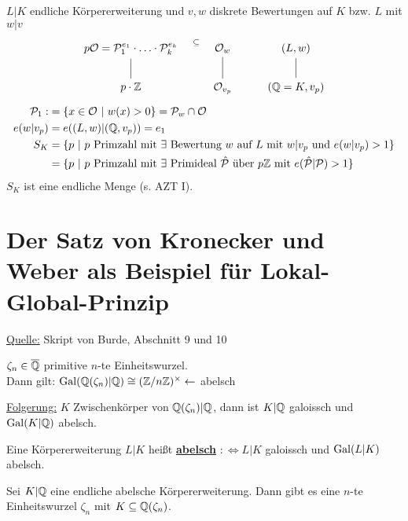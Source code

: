 
\begin{Bem}
$L|K$ endliche Körpererweiterung und $v,w$ diskrete Bewertungen auf $K$ bzw. $L$ mit $w|v$
\[
\begin{tikzcd}
p \O = \mathcal{P}_1^{e_1} \cdot \ldots \cdot \mathcal{P}_k^{e_k} \arrow[draw=none, auto=false, sloped, r, "\subseteq"] & \O_w & (L,w)\\
p\cdot \Z \arrow[dash, u] & \O_{v_p} \arrow[dash, u] & (\Q=K,v_p) \arrow[dash, u]
\end{tikzcd}
\]
\begin{align*}
\mathcal{P}_1:&=\{x \in \mathcal{O} \ | \ w(x) >0\}=\mathcal{P}_w \cap \mathcal{O}\\
e(w|v_p)&=e((L,w)|(\mathbb{Q},v_p))=e_1\\
S_K&=\{p \ | \ p \text{ Primzahl mit } \exists \text{ Bewertung } w \text{ auf } L \text{ mit } w|v_p \text{ und } e(w|v_p)>1\}\\
&=\{p \ | \ p \text{ Primzahl mit } \exists \text{ Primideal } \hat{\mathcal{P}} \text{ über } p \mathbb{Z} \text{ mit } e(\hat{\mathcal{P}}|\mathcal{P})>1\}
\end{align*}
$S_K$ ist eine endliche Menge (s. AZT I).
\end{Bem}

\section{Der Satz von Kronecker und Weber als Beispiel für Lokal-Global-Prinzip}
\underline{Quelle:} Skript von Burde, Abschnitt 9 und 10\\
\begin{Err}
$\zeta_n \in \overline{\mathbb{Q}}$ primitive $n$-te Einheitswurzel.\\
Dann gilt: $\operatorname{Gal}(\mathbb{Q}(\zeta_n)|\mathbb{Q}) \cong (\mathbb{Z}/n\mathbb{Z})^\times \leftarrow $ abelsch
\end{Err}

\underline{Folgerung:} $K$ Zwischenkörper von $\mathbb{Q}(\zeta_n)|\mathbb{Q}$, dann ist $K|\mathbb{Q}$ galoissch und $\operatorname{Gal}(K|\mathbb{Q})$ abelsch.

\begin{defi}
Eine Körpererweiterung $L|K$ heißt \textbf{\underline{abelsch}} $:\iff L|K$ galoissch und $\operatorname{Gal}(L|K)$ abelsch.
\end{defi}

\begin{Satz}
Sei $K|\mathbb{Q}$ eine endliche abelsche Körpererweiterung. Dann gibt es eine $n$-te Einheitswurzel $\zeta_n$ mit $K \subseteq \mathbb{Q}(\zeta_n)$.
\end{Satz}

